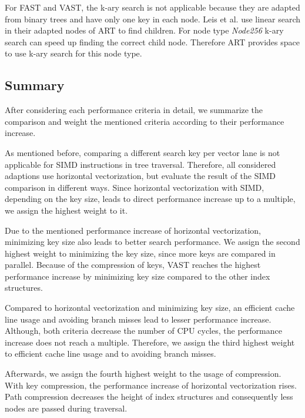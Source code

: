 \documentclass[conference]{IEEEtran}
\begin{document}
For FAST and VAST, the k-ary search is not applicable because they are adapted from binary trees and have only one key in each node. Leis et al. use linear search in their adapted nodes of ART to find children. For node type \emph{Node256} k-ary search can speed up finding the correct child node. Therefore ART provides space to use k-ary search for this node type.

\subsection{Summary}

After considering each performance criteria in detail, we summarize the comparison and weight the mentioned criteria according to their performance increase. 

As mentioned before, comparing a different search key per vector lane is not applicable for SIMD instructions in tree traversal. Therefore, all considered adaptions use horizontal vectorization, but evaluate the result of the SIMD comparison in different ways. Since horizontal vectorization with SIMD, depending on the key size, leads to direct performance increase up to a multiple, we assign the highest weight to it. 

Due to the mentioned performance increase of horizontal vectorization, minimizing key size also leads to better search performance. We assign the second highest weight to minimizing the key size, since more keys are compared in parallel. Because of the compression of keys, VAST reaches the highest performance increase by minimizing key size compared to the other index structures. 

Compared to horizontal vectorization and minimizing key size, an efficient cache line usage and avoiding branch misses lead to lesser performance increase. Although, both criteria decrease the number of CPU cycles, the performance increase does not reach a multiple. Therefore, we assign the third highest weight to efficient cache line usage and to avoiding branch misses.

Afterwards, we assign the fourth highest weight to the usage of compression. With key compression, the performance increase of horizontal vectorization rises. Path compression decreases the height of index structures and consequently less nodes are passed during traversal. 
\end{document}
